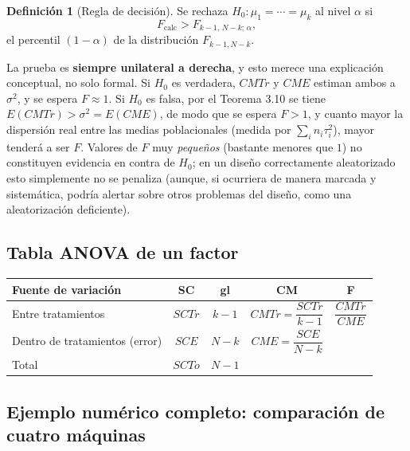 \documentclass[11pt,a4paper]{article}
\theoremstyle{plain}
\theoremstyle{definition}
\newtheorem{definicion}[teorema]{Definición}
\theoremstyle{remark}
\begin{document}
\begin{definicion}[Regla de decisión]
Se rechaza $H_0:\mu_1=\cdots=\mu_k$ al nivel $\alpha$ si
\[
F_{\text{calc}} > F_{k-1,\,N-k;\,\alpha},
\]
el percentil $(1-\alpha)$ de la distribución $F_{k-1,N-k}$.
\end{definicion}

La prueba es \textbf{siempre unilateral a derecha}, y esto merece una explicación conceptual, no solo formal. Si $H_0$ es verdadera, $CMTr$ y $CME$ estiman ambos a $\sigma^2$, y se espera $F\approx1$. Si $H_0$ es falsa, por el Teorema 3.10 se tiene $E(CMTr)>\sigma^2=E(CME)$, de modo que se espera $F>1$, y cuanto mayor la dispersión real entre las medias poblacionales (medida por $\sum_in_i\tau_i^2$), mayor tenderá a ser $F$. Valores de $F$ muy \emph{pequeños} (bastante menores que $1$) no constituyen evidencia en contra de $H_0$; en un diseño correctamente aleatorizado esto simplemente no se penaliza (aunque, si ocurriera de manera marcada y sistemática, podría alertar sobre otros problemas del diseño, como una aleatorización deficiente).

\subsection{Tabla ANOVA de un factor}

\begin{center}
\begin{tabular}{lcccc}
\toprule
Fuente de variación & SC & gl & CM & F \\
\midrule
Entre tratamientos & $SCTr$ & $k-1$ & $CMTr=\dfrac{SCTr}{k-1}$ & $\dfrac{CMTr}{CME}$ \\[8pt]
Dentro de tratamientos (error) & $SCE$ & $N-k$ & $CME=\dfrac{SCE}{N-k}$ & \\[8pt]
\midrule
Total & $SCTo$ & $N-1$ & & \\
\bottomrule
\end{tabular}
\end{center}

\subsection{Ejemplo numérico completo: comparación de cuatro máquinas}
\end{document}
